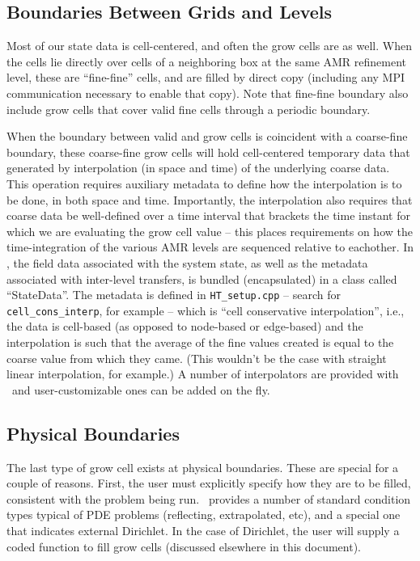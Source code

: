 \subsection{Boundaries Between Grids and Levels}
Most of our state data is cell-centered, and often the grow cells are
as well.  When the cells lie directly over cells of a neighboring box
at the same AMR refinement level, these are ``fine-fine'' cells, and are
filled by direct copy (including any MPI communication necessary to enable
that copy).  Note that fine-fine boundary also include grow cells that
cover valid fine cells through a periodic boundary.

When the boundary between valid and grow cells is coincident
with a coarse-fine boundary, these coarse-fine grow cells will hold cell-centered 
temporary data that generated by interpolation (in space and time) of the
underlying coarse data.  This operation requires auxiliary metadata to define 
how the interpolation is to be done, in both space and time.  Importantly,
the interpolation also requires that coarse data be well-defined over
a time interval that brackets the time instant for which we are evaluating
the grow cell value  -- this places requirements on how the time-integration 
of the various AMR levels are sequenced relative to eachother.
In \boxlib, the field data associated with the system state, as well as the metadata
associated with inter-level transfers, is bundled (encapsulated) in
a class called ``StateData''.  The metadata 
is defined in {\tt HT\_setup.cpp} -- search for
{\tt cell\_cons\_interp}, for example -- which is ``cell conservative
interpolation'', i.e., the data is cell-based (as opposed to node-based
or edge-based) and the interpolation is such that the average of the
fine values created is equal to the coarse value from which they came.
(This wouldn't be the case with straight linear interpolation, for
example.)  A number of interpolators are provided with \boxlib\ and 
user-customizable ones can be added on the fly.

\subsection{Physical Boundaries}
The last type of grow cell exists at physical boundaries.  These are special for 
a couple of reasons.  First, the user must explicitly specify how they are to be
filled, consistent with the problem being run.  \boxlib\ provides a number of 
standard condition types typical of PDE problems (reflecting, extrapolated, etc),
and a special one that indicates external Dirichlet. In the case of Dirichlet,
the user will supply a coded function to fill grow cells (discussed elsewhere in
this document).

